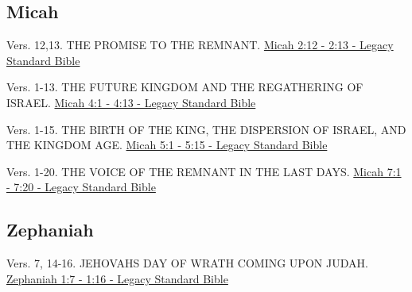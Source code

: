\documentclass[
  ignorenonframetext,
]{beamer}
\begin{document}
\subsection{Micah}\label{micah}

\begin{frame}{2}
\label{section-126}
\begin{block}{Vers. 12,13. THE PROMISE TO THE REMNANT.}
\label{vers.-1213.-the-promise-to-the-remnant.}
\href{https://read.lsbible.org/?q=mic2\%3A12-13}{Micah 2:12 - 2:13 -
Legacy Standard Bible}
\end{block}
\end{frame}

\begin{frame}{4}
\label{section-127}
\begin{block}{Vers. 1-13. THE FUTURE KINGDOM AND THE REGATHERING OF
ISRAEL.}
\label{vers.-1-13.-the-future-kingdom-and-the-regathering-of-israel.}
\href{https://read.lsbible.org/?q=mic4\%3A1-13}{Micah 4:1 - 4:13 -
Legacy Standard Bible}
\end{block}
\end{frame}

\begin{frame}{5}
\label{section-128}
\begin{block}{Vers. 1-15. THE BIRTH OF THE KING, THE DISPERSION OF
ISRAEL, AND THE KINGDOM AGE.}
\label{vers.-1-15.-the-birth-of-the-king-the-dispersion-of-israel-and-the-kingdom-age.}
\href{https://read.lsbible.org/?q=mic5\%3A1-15}{Micah 5:1 - 5:15 -
Legacy Standard Bible}
\end{block}
\end{frame}

\begin{frame}{7}
\label{section-129}
\begin{block}{Vers. 1-20. THE VOICE OF THE REMNANT IN THE LAST DAYS.}
\label{vers.-1-20.-the-voice-of-the-remnant-in-the-last-days.}
\href{https://read.lsbible.org/?q=mic7\%3A1-20}{Micah 7:1 - 7:20 -
Legacy Standard Bible}
\end{block}
\end{frame}

\subsection{Zephaniah}\label{zephaniah}

\begin{frame}{1}
\label{section-130}
\begin{block}{Vers. 7, 14-16. JEHOVAH\textquotesingle S DAY OF WRATH
COMING UPON JUDAH.}
\label{vers.-7-14-16.-jehovahs-day-of-wrath-coming-upon-judah.}
\href{https://read.lsbible.org/?q=zeph1\%3A7-16}{Zephaniah 1:7 - 1:16 -
Legacy Standard Bible}
\end{block}
\end{frame}
\end{document}
